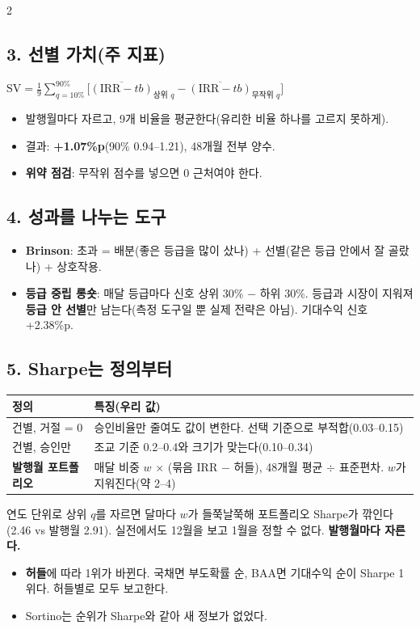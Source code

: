 \begin{multicols}{2}
\subsection*{3. 선별 가치(주 지표)}
\begin{formulabox}
$\mathrm{SV}=\frac19\sum_{q=10\%}^{90\%}\big[\overline{(\mathrm{IRR}-tb)}_{\text{상위 }q}-\overline{(\mathrm{IRR}-tb)}_{\text{무작위 }q}\big]$
\end{formulabox}
\begin{itemize}
\item 발행월마다 자르고, 9개 비율을 평균한다(유리한 비율 하나를 고르지 못하게).
\item 결과: \textbf{+1.07\%p}(90\% 0.94--1.21), 48개월 전부 양수.
\item \textbf{위약 점검}: 무작위 점수를 넣으면 0 근처여야 한다.
\end{itemize}

\subsection*{4. 성과를 나누는 도구}
\begin{itemize}
\item \textbf{Brinson}: 초과 = 배분(좋은 등급을 많이 샀나) + 선별(같은 등급 안에서 잘 골랐나) + 상호작용.
\item \textbf{등급 중립 롱숏}: 매달 등급마다 신호 상위 30\% $-$ 하위 30\%. 등급과 시장이 지워져 \textbf{등급 안 선별}만 남는다(측정 도구일 뿐 실제 전략은 아님). 기대수익 신호 +2.38\%p.
\end{itemize}

\subsection*{5. Sharpe는 정의부터}
\begin{tabularx}{\linewidth}{@{}p{24mm}X@{}}\toprule
정의 & 특징(우리 값)\\\midrule
건별, 거절 = 0 & 승인비율만 줄여도 값이 변한다. 선택 기준으로 부적합(0.03--0.15)\\
건별, 승인만 & 조교 기준 0.2--0.4와 크기가 맞는다(0.10--0.34)\\
\textbf{발행월 포트폴리오} & 매달 비중 $w$ \ensuremath{\times} (묶음 IRR $-$ 허들), 48개월 평균 \ensuremath{\div} 표준편차. $w$가 지워진다(약 2--4)\\\bottomrule
\end{tabularx}
\begin{warnbox}[자르는 단위]
연도 단위로 상위 $q$를 자르면 달마다 $w$가 들쭉날쭉해 포트폴리오 Sharpe가 깎인다(2.46 vs 발행월 2.91). 실전에서도 12월을 보고 1월을 정할 수 없다. \textbf{발행월마다 자른다.}
\end{warnbox}
\begin{itemize}
\item \textbf{허들}에 따라 1위가 바뀐다. 국채면 부도확률 순, BAA면 기대수익 순이 Sharpe 1위다. 허들별로 모두 보고한다.
\item Sortino는 순위가 Sharpe와 같아 새 정보가 없었다.
\end{itemize}


\end{multicols}
